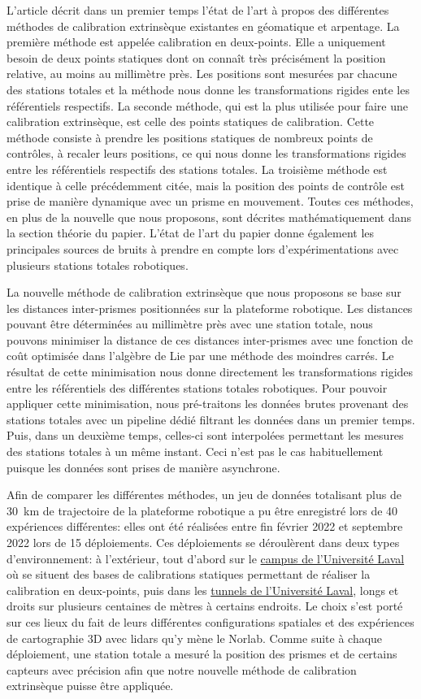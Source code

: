 L'article décrit dans un premier temps l'état de l'art à propos des différentes méthodes de calibration extrinsèque existantes en géomatique et arpentage.
La première méthode est appelée calibration en deux-points.
Elle a uniquement besoin de deux points statiques dont on connaît très précisément la position relative, au moins au millimètre près.
Les positions sont mesurées par chacune des stations totales et la méthode nous donne les transformations rigides ente les référentiels respectifs.
La seconde méthode, qui est la plus utilisée pour faire une calibration extrinsèque, est celle des points statiques de calibration.
Cette méthode consiste à prendre les positions statiques de nombreux points de contrôles, à recaler leurs positions, ce qui nous donne les transformations rigides entre les référentiels respectifs des stations totales.
La troisième méthode est identique à celle précédemment citée, mais la position des points de contrôle est prise de manière dynamique avec un prisme en mouvement. 
Toutes ces méthodes, en plus de la nouvelle que nous proposons, sont décrites mathématiquement dans la section théorie du papier.
L'état de l'art du papier donne également les principales sources de bruits à prendre en compte lors d'expérimentations avec plusieurs stations totales robotiques.

La nouvelle méthode de calibration extrinsèque que nous proposons se base sur les distances inter-prismes positionnées sur la plateforme robotique.
Les distances pouvant être déterminées au millimètre près avec une station totale, nous pouvons minimiser la distance de ces distances inter-prismes avec une fonction de coût optimisée dans l'algèbre de Lie par une méthode des moindres carrés. 
Le résultat de cette minimisation nous donne directement les transformations rigides entre les référentiels des différentes stations totales robotiques.
Pour pouvoir appliquer cette minimisation, nous pré-traitons les données brutes provenant des stations totales avec un pipeline dédié filtrant les données dans un premier temps. 
Puis, dans un deuxième temps, celles-ci sont interpolées permettant les mesures des stations totales à un même instant.
Ceci n'est pas le cas habituellement puisque les données sont prises de manière asynchrone.

Afin de comparer les différentes méthodes, un jeu de données totalisant plus de \SI{30}{km} de trajectoire de la plateforme robotique a pu être enregistré lors de 40 expériences différentes: elles ont été réalisées entre fin février 2022 et septembre 2022 lors de 15 déploiements.
Ces déploiements se déroulèrent dans deux types d'environnement: à l'extérieur, tout d'abord sur le \underline{campus de l'Université Laval} où se situent des bases de calibrations statiques permettant de réaliser la calibration en deux-points, puis dans les \underline{tunnels de l'Université Laval}, longs et droits sur plusieurs centaines de mètres à certains endroits.
Le choix s'est porté sur ces lieux du fait de leurs différentes configurations spatiales et des expériences de cartographie 3D avec lidars qu'y mène le Norlab.
Comme suite à chaque déploiement, une station totale a mesuré la position des prismes et de certains capteurs avec précision afin que notre nouvelle méthode de calibration extrinsèque puisse être appliquée.


